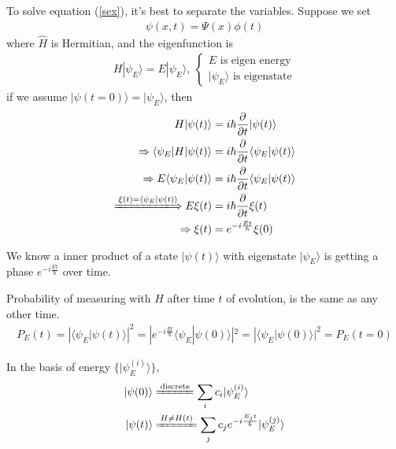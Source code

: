 \documentclass[UTF8,12pt]{article} %
\numberwithin{equation}{section}
\begin{document}
To solve equation (\ref{sex}), it's best to separate the variables. Suppose we set
\begin{align}
\psi(x,t) = \Psi(x)\phi(t)
\end{align}
where $\hat{H}$ is Hermitian, and the eigenfunction is
\begin{align}
H|\psi_{E}\rangle = E|\psi_{E}\rangle,~\begin{cases}E \text{ is eigen energy}\\|\psi_{E}\rangle \text{ is eigenstate}\end{cases}
\end{align}
if we assume $|\psi(t=0)\rangle = |\psi_{E}\rangle$, then
\begin{align}
H|\psi(t)\rangle &= i\hbar\frac{\partial}{\partial t}|\psi(t)\rangle \notag\\
\Rightarrow \langle\psi_{E}|H|\psi(t)\rangle &= i\hbar\frac{\partial}{\partial t}\langle\psi_{E}|\psi(t)\rangle \\
\Rightarrow E\langle\psi_{E}|\psi(t)\rangle &= i\hbar\frac{\partial}{\partial t}\langle\psi_{E}|\psi(t)\rangle \\
\xLongrightarrow{\xi(t) = \langle\psi_{E}|\psi(t)\rangle} E\xi(t) &= i\hbar\frac{\partial}{\partial t}\xi(t) \\
\Rightarrow \xi(t) &= e^{-i\frac{Et}{\hbar}}\xi(0)
\end{align}

\begin{theorem}{}{}
We know a inner product of a state $|\psi(t)\rangle$ with eigenstate $|\psi_{E}\rangle$ is getting a phase $e^{-i\frac{Et}{\hbar}}$ over time.
\end{theorem}

Probability of measuring with $H$ after time $t$ of evolution, is the same as any other time.
\begin{align*}
P_{E}(t) = \left|\langle\psi_{E}|\psi(t)\rangle\right|^{2} = |e^{-i\frac{Et}{\hbar}}\langle \psi_{E}|\psi(0)\rangle|^{2} = |\langle \psi_{E}|\psi(0)\rangle|^{2} = P_{E}(t=0)
\end{align*}

\begin{corollary}{}{}
In the basis of energy $\{|\psi_{E}^{\left(i\right)}\rangle\}$,
\begin{align}
|\psi(0)\rangle &\xlongequal{\text{discrete}} \sum_{i} c_{i}|\psi_{E}^{\left(i\right)}\rangle \\
|\psi(t)\rangle &\xlongequal{H \ne H(t)} \sum_{j} c_{j} e^{-i\frac{E_{j}t}{\hbar}}|\psi_{E}^{\left(j\right)}\rangle
\end{align}
\end{corollary}
\end{document}
